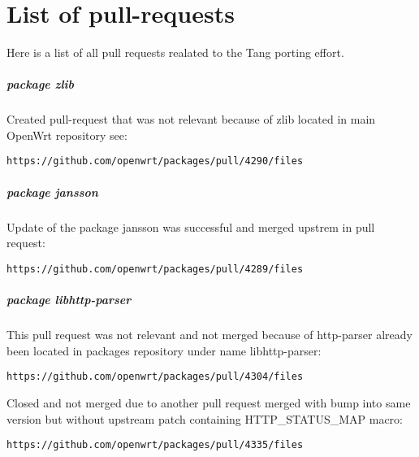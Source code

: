 \chapter{List of pull-requests}\label{diffs}
Here is a list of all pull requests realated to the Tang porting effort.

\paragraph{package zlib}

Created pull-request that was not relevant because of zlib located in main OpenWrt repository see:

\begin{lstlisting}[columns=fixed,basicstyle=\ttfamily\footnotesize,tabsize=4,backgroundcolor=\color{yellow!10}]
https://github.com/openwrt/packages/pull/4290/files
\end{lstlisting}

\paragraph{package jansson}

Update of the package jansson was successful and merged upstrem in pull request:

\begin{lstlisting}[columns=fixed,basicstyle=\ttfamily\footnotesize,tabsize=4,backgroundcolor=\color{yellow!10}]
https://github.com/openwrt/packages/pull/4289/files
\end{lstlisting}

\paragraph{package libhttp-parser}

This pull request was not relevant and not merged because of http-parser already been located in packages repository under name libhttp-parser:

\begin{lstlisting}[columns=fixed,basicstyle=\ttfamily\footnotesize,tabsize=4,backgroundcolor=\color{yellow!10}]
https://github.com/openwrt/packages/pull/4304/files
\end{lstlisting}

Closed and not merged due to another pull request merged with bump into same version but without upstream patch containing HTTP\_STATUS\_MAP macro:
\begin{lstlisting}[columns=fixed,basicstyle=\ttfamily\footnotesize,tabsize=4,backgroundcolor=\color{yellow!10}]
https://github.com/openwrt/packages/pull/4335/files
\end{lstlisting}

